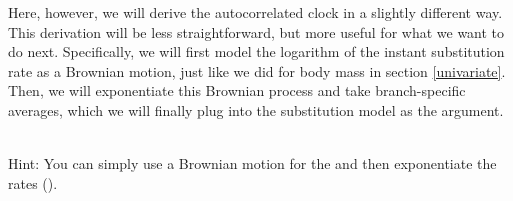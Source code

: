 Here, however, we will derive the autocorrelated clock in a slightly different way. This derivation will be less straightforward, but more useful for what we want to do next.
Specifically, we will first model the logarithm of the instant substitution rate as a Brownian motion, just like we did for body mass in section \ref{univariate}. Then, we will exponentiate this Brownian process and take branch-specific averages, which we will finally plug into the substitution model as the  argument.

\noindent \\ \impmark Hint: You can simply use a Brownian motion for the  and then exponentiate the rates ().






